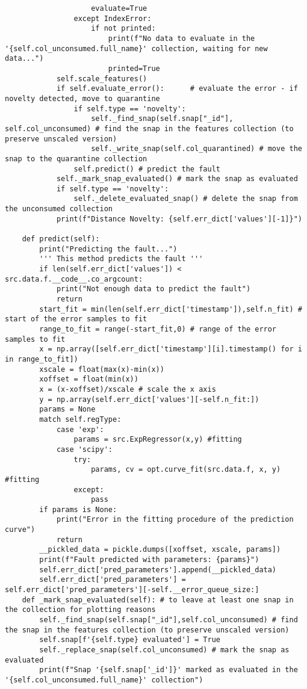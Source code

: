 \begin{verbatim}
                    evaluate=True
                except IndexError:
                    if not printed:
                        print(f"No data to evaluate in the '{self.col_unconsumed.full_name}' collection, waiting for new data...")
                        printed=True
            self.scale_features()
            if self.evaluate_error():      # evaluate the error - if novelty detected, move to quarantine
                if self.type == 'novelty':
                    self._find_snap(self.snap["_id"], self.col_unconsumed) # find the snap in the features collection (to preserve unscaled version)
                    self._write_snap(self.col_quarantined) # move the snap to the quarantine collection
                self.predict() # predict the fault
            self._mark_snap_evaluated() # mark the snap as evaluated
            if self.type == 'novelty':
                self._delete_evaluated_snap() # delete the snap from the unconsumed collection
            print(f"Distance Novelty: {self.err_dict['values'][-1]}")
    
    def predict(self):
        print("Predicting the fault...")
        ''' This method predicts the fault '''
        if len(self.err_dict['values']) < src.data.f.__code__.co_argcount:
            print("Not enough data to predict the fault")
            return
        start_fit = min(len(self.err_dict['timestamp']),self.n_fit) # start of the error samples to fit
        range_to_fit = range(-start_fit,0) # range of the error samples to fit
        x = np.array([self.err_dict['timestamp'][i].timestamp() for i in range_to_fit])
        xscale = float(max(x)-min(x))
        xoffset = float(min(x))
        x = (x-xoffset)/xscale # scale the x axis
        y = np.array(self.err_dict['values'][-self.n_fit:])
        params = None
        match self.regType:
            case 'exp':
                params = src.ExpRegressor(x,y) #fitting
            case 'scipy':
                try:
                    params, cv = opt.curve_fit(src.data.f, x, y) #fitting
                except:
                    pass
        if params is None:
            print("Error in the fitting procedure of the prediction curve")
            return
        __pickled_data = pickle.dumps([xoffset, xscale, params])
        print(f"Fault predicted with parameters: {params}")
        self.err_dict['pred_parameters'].append(__pickled_data)
        self.err_dict['pred_parameters'] = self.err_dict['pred_parameters'][-self.__error_queue_size:]
    def _mark_snap_evaluated(self): # to leave at least one snap in the collection for plotting reasons
        self._find_snap(self.snap["_id"],self.col_unconsumed) # find the snap in the features collection (to preserve unscaled version)
        self.snap[f'{self.type} evaluated'] = True
        self._replace_snap(self.col_unconsumed) # mark the snap as evaluated
        print(f"Snap '{self.snap['_id']}' marked as evaluated in the '{self.col_unconsumed.full_name}' collection")
    

\end{verbatim}
